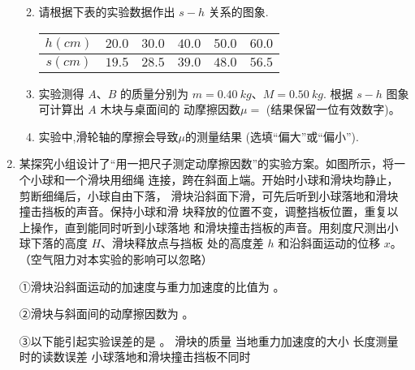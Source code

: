 \begin{enumerate}
\begin{enumerate}

\item 
请根据下表的实验数据作出 $ s-h $ 关系的图象.
\begin{table}[h!]
\centering 
\begin{tabular}{|c|c|c|c|c|c|}
\hline 
$ h(cm) $ & $ 20.0 $ & $ 30.0 $ & $ 40.0 $ & $ 50.0 $ & $ 60.0 $
 \\
\hline
$ s(cm) $ & $ 19.5 $ & $ 28.5 $ & $ 39.0 $ & $ 48.0 $ & $ 56.5 $\\ 
\hline 
\end{tabular}
\end{table} 

\banswer{
  
}


\item 
实验测得 $ A $、$ B $ 的质量分别为 $ m=0.40 \ kg $、$ M=0.50 \ kg $. 根据 $ s-h $ 图象可计算出 $ A $ 木块与桌面间的
动摩擦因数$ \mu = $  (结果保留一位有效数字)。

\item 
实验中,滑轮轴的摩擦会导致$ \mu $的测量结果  (选填“偏大”或“偏小”).

\end{enumerate}



\banswer{

}


\newpage
\item 
{}
某探究小组设计了“用一把尺子测定动摩擦因数”的实验方案。如图所示，将一个小球和一个滑块用细绳
连接，跨在斜面上端。开始时小球和滑块均静止，剪断细绳后，小球自由下落，
滑块沿斜面下滑，可先后听到小球落地和滑块撞击挡板的声音。保持小球和滑
块释放的位置不变，调整挡板位置，重复以上操作，直到能同时听到小球落地
和滑块撞击挡板的声音。用刻度尺测出小球下落的高度 $ H $、滑块释放点与挡板
处的高度差 $ h $ 和沿斜面运动的位移 $ x $。
（空气阻力对本实验的影响可以忽略）
\begin{figure}[h!]
\centering 

\end{figure}


①滑块沿斜面运动的加速度与重力加速度的比值为  。


②滑块与斜面间的动摩擦因数为  。


③以下能引起实验误差的是  。
\fourchoices
{滑块的质量}
{当地重力加速度的大小}
{长度测量时的读数误差}
{小球落地和滑块撞击挡板不同时}





\end{enumerate}
